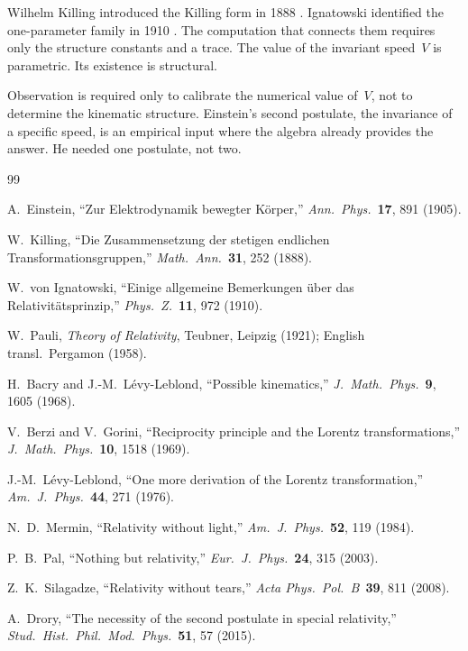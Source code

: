 \documentclass[11pt]{article}
\begin{document}
Wilhelm Killing introduced the Killing form in 1888 \cite{Killing1888}. Ignatowski identified the one-parameter family in 1910 \cite{Ignatowski1910}. The computation that connects them requires only the structure constants and a trace. The value of the invariant speed~$V$ is parametric. Its existence is structural.

Observation is required only to calibrate the numerical value of~$V$, not to determine the kinematic structure. Einstein's second postulate, the invariance of a specific speed, is an empirical input where the algebra already provides the answer. He needed one postulate, not two.


\begin{thebibliography}{99}
\small

A.~Einstein,
``Zur Elektrodynamik bewegter K\"orper,''
\textit{Ann.\ Phys.}\ \textbf{17}, 891 (1905).

W.~Killing,
``Die Zusammensetzung der stetigen endlichen Transformationsgruppen,''
\textit{Math.\ Ann.}\ \textbf{31}, 252 (1888).

W.~von Ignatowski,
``Einige allgemeine Bemerkungen \"uber das Relativit\"atsprinzip,''
\textit{Phys.\ Z.}\ \textbf{11}, 972 (1910).

W.~Pauli,
\textit{Theory of Relativity},
Teubner, Leipzig (1921); English transl.\ Pergamon (1958).

H.~Bacry and J.-M.~L\'evy-Leblond,
``Possible kinematics,''
\textit{J.\ Math.\ Phys.}\ \textbf{9}, 1605 (1968).

V.~Berzi and V.~Gorini,
``Reciprocity principle and the Lorentz transformations,''
\textit{J.\ Math.\ Phys.}\ \textbf{10}, 1518 (1969).

J.-M.~L\'evy-Leblond,
``One more derivation of the Lorentz transformation,''
\textit{Am.\ J.\ Phys.}\ \textbf{44}, 271 (1976).

N.~D.~Mermin,
``Relativity without light,''
\textit{Am.\ J.\ Phys.}\ \textbf{52}, 119 (1984).

P.~B.~Pal,
``Nothing but relativity,''
\textit{Eur.\ J.\ Phys.}\ \textbf{24}, 315 (2003).

Z.~K.~Silagadze,
``Relativity without tears,''
\textit{Acta Phys.\ Pol.\ B}\ \textbf{39}, 811 (2008).

A.~Drory,
``The necessity of the second postulate in special relativity,''
\textit{Stud.\ Hist.\ Phil.\ Mod.\ Phys.}\ \textbf{51}, 57 (2015).

\end{thebibliography}
\end{document}
